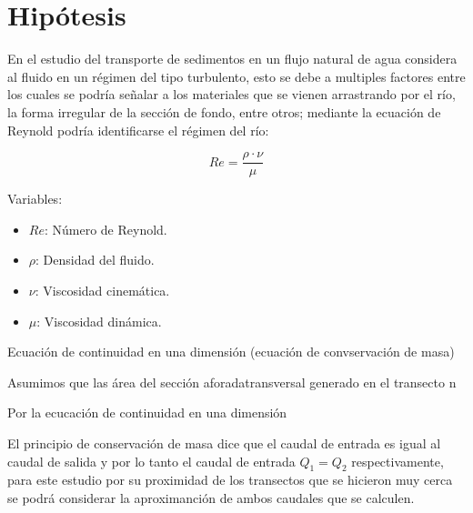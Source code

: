 \documentclass[12pt,a4paper]{report}
\begin{document}
\section{Hipótesis}
	
	En el estudio del transporte de sedimentos en un flujo natural de agua considera al fluido en un régimen del tipo turbulento, esto se debe a multiples factores entre los cuales se podría señalar a los materiales que se vienen arrastrando por el río, la forma irregular de la sección de fondo, entre otros; mediante la ecuación de Reynold podría identificarse el régimen del río:

\begin{equation*}
Re = \frac{\rho\cdot \nu }{\mu }
\end{equation*}

Variables:\\
\begin{itemize}
\item $Re$: Número de Reynold.
\item $\rho$: Densidad del fluido.
\item $\nu$: Viscosidad cinemática.
\item $\mu$: Viscosidad dinámica.
\end{itemize}





Ecuación de continuidad en una dimensión (ecuación de convservación de masa)

Asumimos que las área del sección aforadatransversal generado en el transecto n

Por la ecucación de continuidad en una dimensión 

El principio de conservación de masa dice que el caudal de entrada es igual al caudal de salida y por lo tanto el caudal de entrada $Q_1=Q_2$ respectivamente, para este estudio por su proximidad de los transectos que se hicieron muy cerca se podrá considerar la aproximanción de ambos caudales que se calculen.
\end{document}

